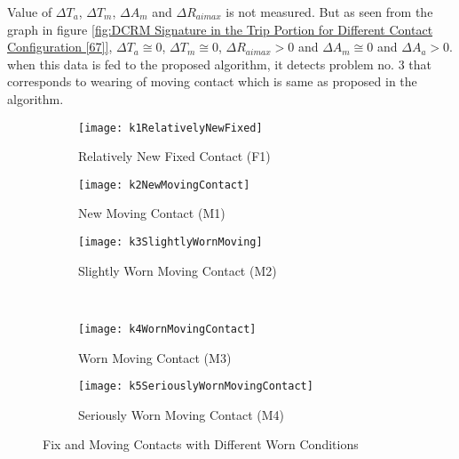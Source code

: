 Value of $\Delta T_a$, $\Delta T_m$, $\Delta A_m$ and $\Delta R_{aimax}$ is not measured. But as seen from the graph in figure \ref{fig:DCRM Signature in the Trip Portion for Different Contact Configuration [67]}, $\Delta T_a \cong 0$, $\Delta T_m \cong 0$, $\Delta R_{aimax} > 0$ and $\Delta A_m \cong 0$ and $\Delta A_a > 0$. when this data is fed to the proposed algorithm, it detects problem no. 3 that corresponds to wearing of moving contact which is same as proposed in the algorithm.

\begin{figure}
    \centering
    \begin{subfigure}[b]{0.3\textwidth}
        \centering
        \texttt{[image: k1RelativelyNewFixed]}
        \caption{Relatively New Fixed Contact (F1)}
        \label{fig:Relatively New Fixed Contact}
    \end{subfigure}
    \begin{subfigure}[b]{0.3\textwidth}
        \centering
        \texttt{[image: k2NewMovingContact]}
        \caption{New Moving Contact (M1)}
        \label{fig:New Moving Contact}
    \end{subfigure}
    \begin{subfigure}[b]{0.3\textwidth}
        \centering
        \texttt{[image: k3SlightlyWornMoving]}
        \caption{Slightly Worn Moving Contact (M2)}
        \label{fig:Slightly Worn Moving Contact}
    \end{subfigure}
    \\
    \begin{subfigure}[b]{0.3\textwidth}
        \centering
        \texttt{[image: k4WornMovingContact]}
        \caption{Worn Moving Contact (M3)}
        \label{fig:Worn Moving Contact}
    \end{subfigure}
    \begin{subfigure}[b]{0.3\textwidth}
        \centering
        \texttt{[image: k5SeriouslyWornMovingContact]}
        \caption{Seriously Worn Moving Contact (M4)}
        \label{fig:Seriously Worn Moving Contact}
    \end{subfigure}
    \caption[Fix and Moving Contacts with Different Worn Conditions]{Fix and Moving Contacts with Different Worn Conditions \cite{salamanca1993preventive}}
    \label{fig:Fix and Moving Contacts with Different Worn Conditions}
\end{figure}

